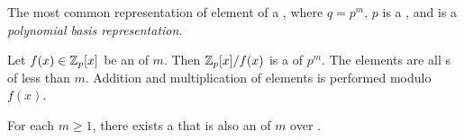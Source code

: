\begin{definition}
  The most common representation of element of a  , where $q = p^{m}$, $p$ is a , and is a \emph{polynomial basis representation}.
\end{definition}

\begin{theorem}\label{thm:Polynomial_Ring-Addition_Multiplication_Elements}
  Let $f(x) \in \mathbb{Z}_{p}[x]$ be an  of  $m$.
  Then $\mathbb{Z}_{p}[x] / f(x)$ is a  of  $p^{m}$.
  The elements are all s of  less than $m$.
  Addition and multiplication of elements is performed modulo $f(x)$.
\end{theorem}

\begin{lemma}\label{lemma:Polynomial_Ring-Monic_Irreducible_Polynomial_Existence}
  For each $m \geq 1$, there exists a  that is also an  of  $m$ over .
\end{lemma}
